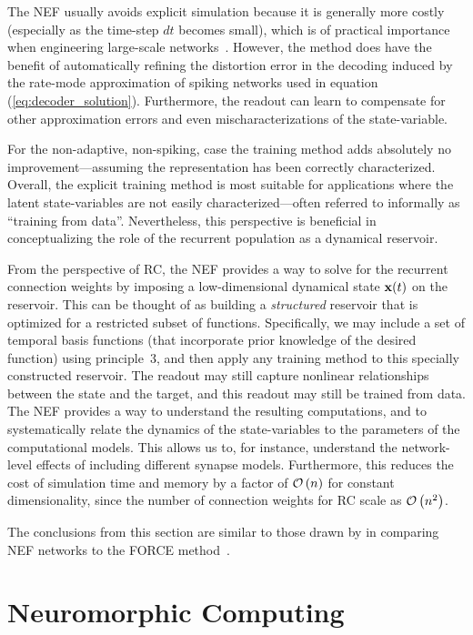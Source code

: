 The NEF usually avoids explicit simulation because it is generally more costly (especially as the time-step $dt$ becomes small), which is of practical importance when engineering large-scale networks~\citep[e.g.,][]{eliasmith2012large}.
However, the method does have the benefit of automatically refining the distortion error in the decoding induced by the rate-mode approximation of spiking networks used in equation (\ref{eq:decoder_solution}).
Furthermore, the readout can learn to compensate for other approximation errors and even mischaracterizations of the state-variable.

For the non-adaptive, non-spiking, case the training method adds absolutely no improvement---assuming the representation has been correctly characterized.
Overall, the explicit training method is most suitable for applications where the latent state-variables are not easily characterized---often referred to informally as ``training from data''.
Nevertheless, this perspective is beneficial in conceptualizing the role of the recurrent population as a dynamical reservoir.

From the perspective of RC, the NEF provides a way to solve for the recurrent connection weights by imposing a low-dimensional dynamical state $\mathbf{x}(t)$ on the reservoir.
This can be thought of as building a  \emph{structured} reservoir that is optimized for a restricted subset of functions.
Specifically, we may include a set of temporal basis functions (that incorporate prior knowledge of the desired function) using principle~3, and then apply any training method to this specially constructed reservoir.
The readout may still capture nonlinear relationships between the state and the target, and this readout may still be trained from data.
The NEF provides a way to understand the resulting computations, and to systematically relate the dynamics of the state-variables to the parameters of the computational models.
This allows us to, for instance, understand the network-level effects of including different synapse models.
Furthermore, this reduces the cost of simulation time and memory by a factor of $\mathcal{O}\left({ n }\right)$ for constant dimensionality, since the number of connection weights for RC scale as $\mathcal{O}\left({ n^2 }\right)$.

The conclusions from this section are similar to those drawn by \citet[][see supplementary~S1]{nicola2016supervised} in comparing NEF networks to the FORCE method~\citep{sussillo2009generating, abbott2016building}.


\section{Neuromorphic Computing}
\label{sec:neuromorphic}

